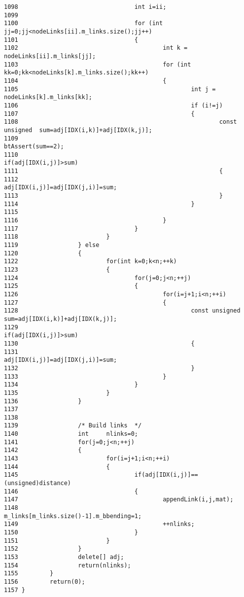 \begin{Code}
\begin{verbatim}
1098                                 int i=ii;
1099 
1100                                 for (int jj=0;jj<nodeLinks[ii].m_links.size();jj++)
1101                                 {
1102                                         int k = nodeLinks[ii].m_links[jj];
1103                                         for (int kk=0;kk<nodeLinks[k].m_links.size();kk++)
1104                                         {
1105                                                 int j = nodeLinks[k].m_links[kk];
1106                                                 if (i!=j)
1107                                                 {
1108                                                         const unsigned  sum=adj[IDX(i,k)]+adj[IDX(k,j)];
1109                                                         btAssert(sum==2);
1110                                                         if(adj[IDX(i,j)]>sum)
1111                                                         {
1112                                                                 adj[IDX(i,j)]=adj[IDX(j,i)]=sum;
1113                                                         }
1114                                                 }
1115 
1116                                         }
1117                                 }
1118                         }
1119                 } else
1120                 {
1122                         for(int k=0;k<n;++k)
1123                         {
1124                                 for(j=0;j<n;++j)
1125                                 {
1126                                         for(i=j+1;i<n;++i)
1127                                         {
1128                                                 const unsigned  sum=adj[IDX(i,k)]+adj[IDX(k,j)];
1129                                                 if(adj[IDX(i,j)]>sum)
1130                                                 {
1131                                                         adj[IDX(i,j)]=adj[IDX(j,i)]=sum;
1132                                                 }
1133                                         }
1134                                 }
1135                         }
1136                 }
1137 
1138 
1139                 /* Build links  */ 
1140                 int     nlinks=0;
1141                 for(j=0;j<n;++j)
1142                 {
1143                         for(i=j+1;i<n;++i)
1144                         {
1145                                 if(adj[IDX(i,j)]==(unsigned)distance)
1146                                 {
1147                                         appendLink(i,j,mat);
1148                                         m_links[m_links.size()-1].m_bbending=1;
1149                                         ++nlinks;
1150                                 }
1151                         }
1152                 }
1153                 delete[] adj;           
1154                 return(nlinks);
1155         }
1156         return(0);
1157 }
\end{verbatim}
\end{Code}




